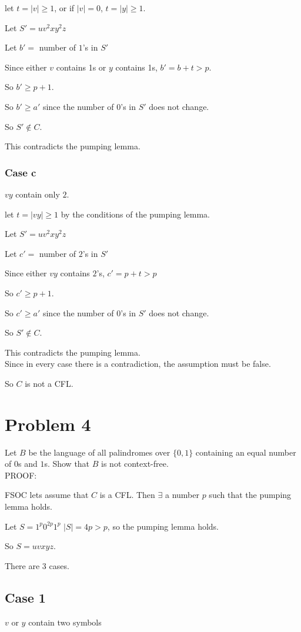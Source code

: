 \documentclass[letterpaper, 11pt]{article}
\begin{document}
let $t = |v| \geq 1$, or if $|v| = 0$, $t = |y| \geq 1$. 

Let $S' = uv^2xy^2z$

Let $b' =$ number of $1$'s in $S'$

Since either $v$ contains 1s or $y$ contains 1s, $b' = b+t > p$.

So $b' \geq p + 1$.

So $b' \geq a'$ since the number of $0$'s in $S'$ does not change.

So $S' \notin C$.

This contradicts the pumping lemma.
\subsubsection*{Case c}
$vy$ contain only $2$.

let $t = |vy| \geq 1$ by the conditions of the pumping lemma. 

Let $S' = uv^2xy^2z$

Let $c' =$ number of $2$'s in $S'$

Since either $vy$ contains $2$'s, $c' = p + t > p$

So $c' \geq p + 1$.

So $c' \geq a'$ since the number of $0$'s in $S'$ does not change.

So $S' \notin C$.

This contradicts the pumping lemma.\\

Since in every case there is a contradiction, the assumption must be false.

So $C$ is not a CFL.
\newpage
\section*{Problem 4}
Let $B$ be the language of all palindromes over $\{0, 1\}$ containing an equal number of $0$s and $1$s. Show that $B$ is not context-free.\\

PROOF:

FSOC lets assume that $C$ is a CFL.
Then $\exists$ a number $p$ such that the pumping lemma holds.

Let $S = 1^p0^{2p}1^p$
$|S| = 4p > p$, so the pumping lemma holds.

So $S = uvxyz$.

There are 3 cases.
\subsection*{Case 1}
$v$ or $y$ contain two symbols
\end{document}
